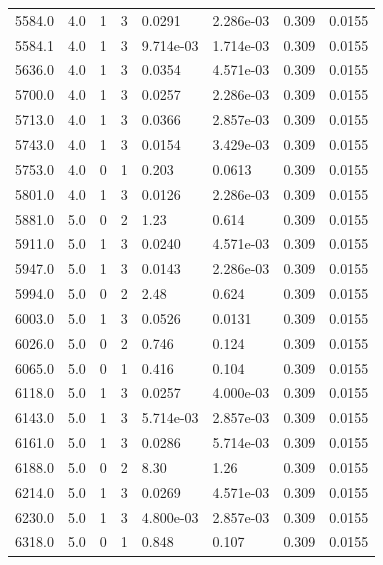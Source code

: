 \documentclass[preview]{standalone}
\begin{document}
{{{{{{\begin{tabular}{L{1.2cm}C{1.2cm} C{0.3cm}C{0.5cm} C{1.4cm}C{1.4cm} C{1.4cm}C{1.4cm}}
  5584.0  &   4.0  & 1     &  3 &  0.0291  & 2.286e-03  & 0.309 &  0.0155   \\ 
  5584.1  &   4.0  & 1     &  3 &  9.714e-03  & 1.714e-03  & 0.309 &  0.0155   \\ 
  5636.0  &   4.0  & 1     &  3 &  0.0354  & 4.571e-03  & 0.309 &  0.0155   \\ 
  5700.0  &   4.0  & 1     &  3 &  0.0257  & 2.286e-03  & 0.309 &  0.0155   \\ 
  5713.0  &   4.0  & 1     &  3 &  0.0366  & 2.857e-03  & 0.309 &  0.0155   \\ 
  5743.0  &   4.0  & 1     &  3 &  0.0154  & 3.429e-03  & 0.309 &  0.0155   \\ 
  5753.0  &   4.0  & 0     &  1 &  0.203  & 0.0613  & 0.309 &  0.0155   \\ 
  5801.0  &   4.0  & 1     &  3 &  0.0126  & 2.286e-03  & 0.309 &  0.0155   \\ 
  5881.0  &   5.0  & 0     &  2 &  1.23  & 0.614  & 0.309 &  0.0155   \\ 
  5911.0  &   5.0  & 1     &  3 &  0.0240  & 4.571e-03  & 0.309 &  0.0155   \\ 
  5947.0  &   5.0  & 1     &  3 &  0.0143  & 2.286e-03  & 0.309 &  0.0155   \\ 
  5994.0  &   5.0  & 0     &  2 &  2.48  & 0.624  & 0.309 &  0.0155   \\ 
  6003.0  &   5.0  & 1     &  3 &  0.0526  & 0.0131  & 0.309 &  0.0155   \\ 
  6026.0  &   5.0  & 0     &  2 &  0.746  & 0.124  & 0.309 &  0.0155   \\ 
  6065.0  &   5.0  & 0     &  1 &  0.416  & 0.104  & 0.309 &  0.0155   \\ 
  6118.0  &   5.0  & 1     &  3 &  0.0257  & 4.000e-03  & 0.309 &  0.0155   \\ 
  6143.0  &   5.0  & 1     &  3 &  5.714e-03  & 2.857e-03  & 0.309 &  0.0155   \\ 
  6161.0  &   5.0  & 1     &  3 &  0.0286  & 5.714e-03  & 0.309 &  0.0155   \\ 
  6188.0  &   5.0  & 0     &  2 &  8.30  & 1.26  & 0.309 &  0.0155   \\ 
  6214.0  &   5.0  & 1     &  3 &  0.0269  & 4.571e-03  & 0.309 &  0.0155   \\ 
  6230.0  &   5.0  & 1     &  3 &  4.800e-03  & 2.857e-03  & 0.309 &  0.0155   \\ 
  6318.0  &   5.0  & 0     &  1 &  0.848  & 0.107  & 0.309 &  0.0155   \\ 

\end{tabular}}}}}}}
\end{document}
